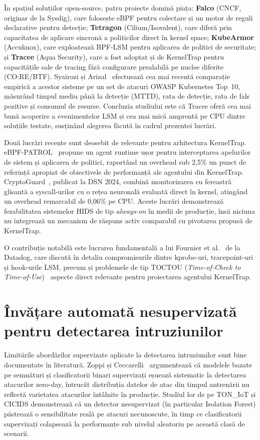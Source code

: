În spațiul soluțiilor open-source, patru proiecte domină piața:
\textbf{Falco} (CNCF, originar de la Sysdig), care folosește eBPF pentru
colectare și un motor de reguli declarative pentru detecție;
\textbf{Tetragon} (Cilium/Isovalent), care diferă prin capacitatea de aplicare
sincronă a politicilor direct în kernel space;
\textbf{KubeArmor} (Accuknox), care exploatează BPF-LSM pentru aplicarea de
politici de securitate;
și \textbf{Tracee} (Aqua Security), care a fost adoptat și de KernelTrap
pentru capacitățile sale de tracing fără configurare prealabilă pe nuclee
diferite (CO:RE/BTF).
Syairozi și Arizal~\cite{syairozi2025ebpfcomparative} efectuează cea mai
recentă comparație empirică a acestor sisteme pe un set de atacuri OWASP
Kubernetes Top~10, măsurând timpul mediu până la detecție (MTTD), rata de
detecție, rata de fals pozitive și consumul de resurse.
Concluzia studiului este că Tracee oferă cea mai bună acoperire a evenimentelor
LSM și cea mai mică amprentă pe CPU dintre soluțiile testate, susținând
alegerea făcută în cadrul prezentei lucrări.

Două lucrări recente sunt deosebit de relevante pentru arhitectura KernelTrap.
eBPF-PATROL~\cite{ebpfpatrol2025} propune un agent runtime ușor pentru
interceptarea apelurilor de sistem și aplicarea de politici, raportând un
overhead sub 2,5\% un punct de referință apropiat de obiectivele de
performanță ale agentului din KernelTrap.
CryptoGuard~\cite{cryptoguard2024}, publicat la DSN 2024, combină monitorizarea
cu fereastră glisantă a syscall-urilor cu o rețea neuronală evaluată direct în
kernel, atingând un overhead remarcabil de 0,06\% pe CPU.
Aceste lucrări demonstrează fezabilitatea sistemelor HIDS de tip
\textit{always-on} în medii de producție, însă niciuna nu integrează un
mecanism de răspuns activ comparabil cu pivotarea propusă de KernelTrap.

O contribuție notabilă este lucrarea fundamentală a lui Fournier et
al.~\cite{fournier2021ebpf} de la Datadog, care discută în detaliu
compromisurile dintre kprobe-uri, tracepoint-uri și hook-urile LSM, precum și
problemele de tip TOCTOU (\textit{Time-of-Check to Time-of-Use})~ aspecte
direct relevante pentru proiectarea agentului KernelTrap.

\section{Învățare automată nesupervizată pentru detectarea intruziunilor}

Limitările abordărilor supervizate aplicate la detectarea intruziunilor sunt
bine documentate în literatură.
Zoppi și Ceccarelli~\cite{zoppi2022unsupervised,zoppi2022stacking} argumentează 
că modelele bazate pe semnături și clasificatorii binari
supervizați eșuează sistematic la detectarea atacurilor zero-day, întrucât
distribuția datelor de atac din timpul antrenării nu reflectă varietatea
atacurilor întâlnite în producție.
Studiul lor de pe TON\_IoT și CICIDS demonstrează că un detector nesupervizat
(în particular Isolation Forest) păstrează o sensibilitate reală pe atacuri
necunoscute, în timp ce clasificatorii supervizați colapsează la performanțe
sub nivelul aleatoriu pe această clasă de scenarii.

